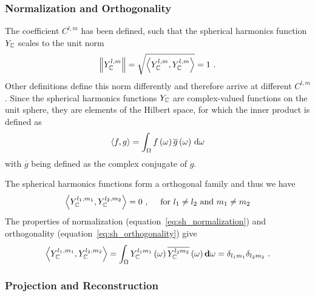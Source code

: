 
\subsubsection*{Normalization and Orthogonality}

The coefficient $C^{l,m}$ has been defined, such that the spherical harmonics function $Y_{\mathbb{C}}$ scales to the unit norm
\begin{align}
\label{eq:sh_normalization}
\left\lVert Y_{\mathbb{C}}^{l,m}\right\rVert = \sqrt{\left<Y_{\mathbb{C}}^{l,m}, Y_{\mathbb{C}}^{l,m}\right>} = 1
\ .
\end{align}
Other definitions define this norm differently and therefore arrive at different $C^{l,m}$. Since the spherical harmonics functions $Y_{\mathbb{C}}$ are complex-valued functions on the unit sphere, they are elements of the Hilbert space, for which the inner product is defined as
\begin{align}
\label{eq:sh_inner_product}
\left<f,g\right> = \int_\Omega f\left(\omega\right)\overline{g}\left(\omega\right)\,\mathrm{d}\omega
\end{align}
with $\overline{g}$ being defined as the complex conjugate of $g$.

The spherical harmonics functions form a orthogonal family and thus we have
\begin{align}
\left<Y_{\mathbb{C}}^{l_1, m_1},Y_{\mathbb{C}}^{l_2, m_2}\right>
=
0
\ ,\quad\text{ for } l_1 \ne l_2 \text{ and } m_1 \ne m_2
\end{align}
The properties of normalization (equation~\ref{eq:sh_normalization}) and orthogonality (equation~\ref{eq:sh_orthogonality}) give
\begin{align}
\label{eq:sh_orthogonality}
\left<Y_{\mathbb{C}}^{l_1, m_1},Y_{\mathbb{C}}^{l_2, m_2}\right>=
\int_{\Omega} Y_{\mathbb{C}}^{l_1m_1}\left(\omega\right) \overline{Y_{\mathbb{C}}^{l_2m_2}}\left(\omega\right) \mathbf{d}\omega = \delta_{l_1m_1}\delta_{l_2m_2}
\ .
\end{align}

\subsubsection*{Projection and Reconstruction}

